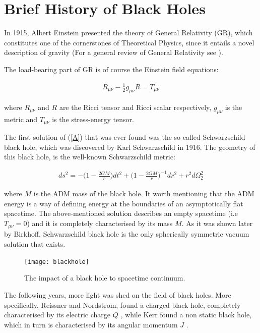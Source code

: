 \documentclass[a4paper,notitlepage]{report}
\begin{document}
\section{Brief History of Black Holes}

In 1915, Albert Einstein presented the theory of General Relativity (GR), which constitutes one of the cornerstones of Theoretical Physics, since it entails a novel description of gravity (For a general review of General Relativity see   \cite{carroll2004spacetime,hartle2003gravity,schutz2009first,mcmahon2006relativity}). 

The load-bearing part of GR is of course the Einstein field equations:

\begin{align}\label{A}
R_{\mu\nu} - \frac{1}{2} g_{\mu\nu} R = T_{\mu\nu}
\end{align}

\vspace{0.5 em}
where $R_{\mu\nu}$ and $R$ are the Ricci tensor and Ricci scalar respectively, $g_{\mu\nu}$ is the metric and $T_{\mu\nu}$ is the stress-energy tensor.

The first solution of (\ref{A}) that was ever found was the so-called Schwarzschild black hole, which was discovered by Karl Schwarzschild in 1916. The geometry of this black hole, is the well-known Schwarzschild metric:

\begin{align} \label{B}
ds^2 = - \Big(1- \frac{2GM}{r} \Big) dt^2 + \Big(1- \frac{2GM}{r} \Big)^{-1} dr^2 + r^2 d\Omega^2_2
\end{align}

\vspace{0.5 em}
where $M$ is the ADM mass of the black hole. It worth mentioning that the ADM energy is a way of defining energy at the boundaries of an asymptotically flat spacetime. The above-mentioned solution describes an empty spacetime (i.e $T_{\mu\nu} = 0$) and it is completely characterised by its mass $M$. As it was shown later by Birkhoff, Schwarzschild black hole is the only spherically symmetric vacuum solution that exists. 

\begin{figure}[ht]
\centering
\texttt{[image: blackhole]}
\caption{The impact of a black hole to spacetime continuum.}
\label{Mtheory}
\end{figure}

The following years, more light was shed on the field of black holes. More specifically, Reissner and Nordstrom, found a charged black hole, completely characterised by its electric charge $Q$ \cite{reissner1916eigengravitation,nordstrom1918energy}, while Kerr found a non static black hole, which in turn is characterised by its angular momentum $J$ \cite{kerr1963gravitational}.
\end{document}
